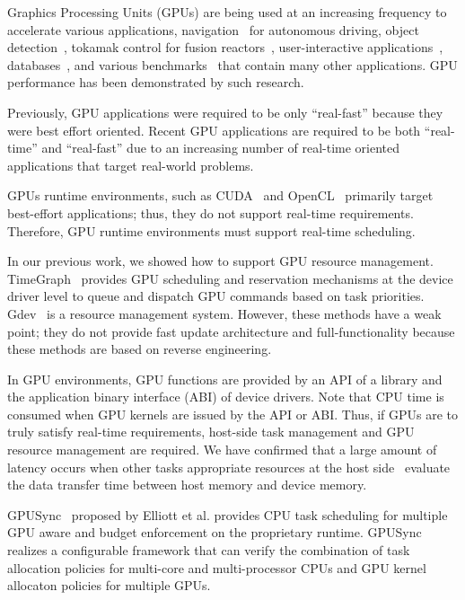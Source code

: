 Graphics Processing Units (GPUs) are being used at an increasing frequency to accelerate various applications,
navigation~\cite{cmu:routing} for autonomous driving, object detection~\cite{hirabayashi:cpsna2013},
tokamak control for fusion reactors~\cite{tokamak},
user-interactive applications~\cite{kato:rtas2011}, databases~\cite{bakkum:sql}, and various benchmarks~\cite{rodinia} that contain many other applications.
GPU performance has been demonstrated by such research.

Previously, GPU applications were required to be only ``real-fast'' because they were best effort oriented.
Recent GPU applications are required to be both ``real-time'' and ``real-fast'' due to an increasing number of real-time oriented applications that target real-world problems.

GPUs runtime environments, such as CUDA~\cite{nvidia:cuda_zone} and OpenCL~\cite{opencl} 
primarily target  best-effort applications; thus, they do not support real-time requirements.
Therefore, GPU runtime environments must support real-time scheduling.

In our previous work,
we showed how to support GPU resource management\cite{kato:timegraph,kato:gdev}.
TimeGraph~\cite{kato:timegraph} provides GPU scheduling and reservation mechanisms at the device driver level to queue and dispatch GPU commands based on task priorities.
Gdev~\cite{kato:gdev} is a resource management system.
However, these methods have a weak point; they do not provide fast update architecture and full-functionality
because these methods are based on reverse engineering.

In GPU environments,
GPU functions are provided by an API of a library and the application binary interface (ABI) of device drivers.
Note that CPU time is consumed when GPU kernels are issued by the API or ABI.
Thus, if GPUs are to truly satisfy real-time requirements,
host-side task management and GPU resource management are required.
We have confirmed that a large amount of latency occurs
when other tasks appropriate resources at the host side~\cite{fujii:icpads2013} evaluate the data transfer time between host memory and device memory.

GPUSync~\cite{elliott:gpusync13,elliott:explor14} proposed by Elliott et al. provides CPU task scheduling for multiple GPU aware and budget enforcement on the proprietary runtime.
GPUSync realizes a configurable framework that can verify the combination of task allocation policies for multi-core and multi-processor CPUs and GPU kernel allocaton policies for multiple GPUs.


